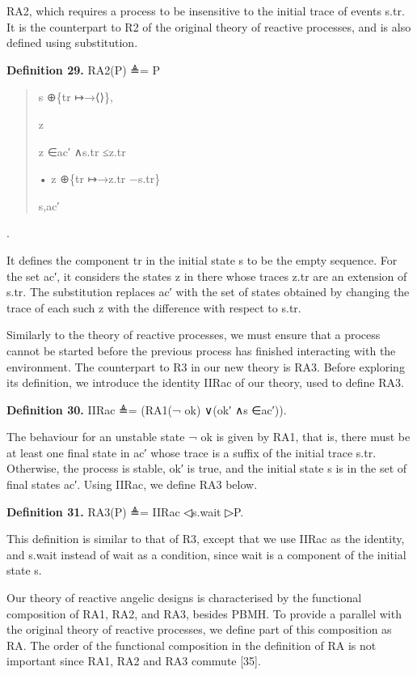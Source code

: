 \documentclass[11pt]{article}
\begin{document}
RA2, which requires a process to be insensitive to the initial trace of events s.tr. It is the counterpart to R2 of the original theory of reactive processes, and is also defined using substitution.

\noindent\textbf{Definition 29.} RA2(P) ≜= P


\begin{quote}\small\raggedright
s ⊕\{tr ↦→⟨⟩\},
\par
z
\par
z ∈ac′ ∧s.tr ≤z.tr
\par
• z ⊕\{tr ↦→z.tr −s.tr\}
\par
s,ac′
\end{quote}

.

It defines the component tr in the initial state s to be the empty sequence. For the set ac′, it considers the states z in there whose traces z.tr are an extension of s.tr. The substitution replaces ac′ with the set of states obtained by changing the trace of each such z with the difference with respect to s.tr.

Similarly to the theory of reactive processes, we must ensure that a process cannot be started before the previous process has finished interacting with the environment. The counterpart to R3 in our new theory is RA3. Before exploring its definition, we introduce the identity IIRac of our theory, used to define RA3.

\noindent\textbf{Definition 30.} IIRac ≜= (RA1(¬ ok) ∨(ok′ ∧s ∈ac′)).


The behaviour for an unstable state ¬ ok is given by RA1, that is, there must be at least one final state in ac′ whose trace is a suffix of the initial trace s.tr. Otherwise, the process is stable, ok′ is true, and the initial state s is in the set of final states ac′. Using IIRac, we define RA3 below.

\noindent\textbf{Definition 31.} RA3(P) ≜= IIRac ◁s.wait ▷P.


This definition is similar to that of R3, except that we use IIRac as the identity, and s.wait instead of wait as a condition, since wait is a component of the initial state s.

Our theory of reactive angelic designs is characterised by the functional composition of RA1, RA2, and RA3, besides PBMH. To provide a parallel with the original theory of reactive processes, we define part of this composition as RA. The order of the functional composition in the definition of RA is not important since RA1, RA2 and RA3 commute [35].
\end{document}
